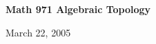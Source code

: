 \def\ccy{\Cyan}		  %
\def\cpb{\ProcessBlue}	  %
\def\csb{\SkyBlue}	  %
\def\ctu{\Turquoise}	  %
\def\ctb{\TealBlue}	  %
\def\caq{\Aquamarine}	  %
\def\cbg{\BlueGreen}	  %
\def\cem{\Emerald}	  %
\def\csg{\SeaGreen}	  %
\def\cgg{\Green}	  %
\def\cfg{\ForestGreen}	  %
\def\cpg{\PineGreen}	  %
\def\clg{\LimeGreen}	  %
\def\cyg{\YellowGreen}	  %
\def\cspg{\SpringGreen}	  %
\def\cog{\OliveGreen}	  %
\def\pars{\RawSienna}	  %
\def\cse{\Sepia}		  %
\def\cbr{\Brown}		  %
\def\cta{\Tan}		  %
\def\cgr{\Gray}		  %
\def\cbl{\Black}		  %
\def\cwh{\White}		  %


\loadmsbm



\def\ctln{\centerline}
\def\u{\underbar}
\def\ssk{\smallskip}
\def\msk{\medskip}
\def\bsk{\bigskip}
\def\hsk{\hskip.1in}
\def\hhsk{\hskip.2in}
\def\dsl{\displaystyle}
\def\hskp{\hskip1.5in}

\def\lra{$\Leftrightarrow$ }
\def\ra{\rightarrow}
\def\mpto{\logmapsto}
\def\pu{\pi_1}
\def\mpu{$\pi_1$}
\def\sig{\Sigma}
\def\msig{$\Sigma$}
\def\ep{\epsilon}
\def\sset{\subseteq}
\def\del{\partial}
\def\inv{^{-1}}
\def\wtl{\widetilde}
\def\lra{\Leftrightarrow}
\def\del{\partial}
\def\delp{\partial^\prime}
\def\delpp{\partial^{\prime\prime}}



\ctln{\bf Math 971 Algebraic Topology}

\ssk

\ctln{March 22, 2005}

\msk

